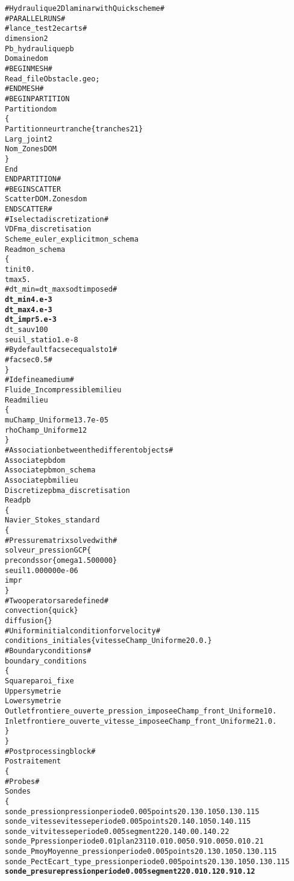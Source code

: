 \begin{alltt}
# Hydraulique 2D laminar with Quick scheme #
# PARALLEL RUNS # 
# lance_test 2 ecarts # 
dimension 2 
Pb_hydraulique pb 
Domaine dom 
# BEGIN MESH # 
Read_file Obstacle.geo ; 
# END MESH # 
# BEGIN PARTITION 
Partition dom 
\{ 
    Partitionneur tranche \{ tranches 2 1 \} 
    Larg_joint 2 
    Nom_Zones DOM 
\} 
End 
END PARTITION # 
# BEGIN SCATTER 
Scatter DOM.Zones dom 
END SCATTER # 
# I select a discretization # 
VDF ma_discretisation 
Scheme_euler_explicit mon_schema 
Read mon_schema 
\{ 
    tinit 0. 
    tmax 5. 
    # dt_min=dt_max so dt imposed # 
    {\bf{dt_min 4.e-3}}
    {\bf{dt_max 4.e-3}}
    {\bf{dt_impr 5.e-3}}
    dt_sauv 100 
    seuil_statio 1.e-8 
    # By default facsec equals to 1 # 
    # facsec 0.5 # 
\} 
# I define a medium # 
Fluide_Incompressible milieu 
Read milieu 
\{ 
    mu Champ_Uniforme 1 3.7e-05 
    rho Champ_Uniforme 1 2 
\} 
# Association between the different objects # 
Associate pb dom 
Associate pb mon_schema 
Associate pb milieu 
Discretize pb ma_discretisation 
Read pb 
\{ 
    Navier_Stokes_standard 
    \{ 
        # Pressure matrix solved with # 
            solveur_pression GCP \{  
            precond ssor \{ omega 1.500000 \}  
            seuil 1.000000e-06  
            impr  
        \} 
        # Two operators are defined # 
        convection \{ quick \} 
        diffusion \{ \} 
        # Uniform initial condition for velocity # 
        conditions_initiales \{ vitesse Champ_Uniforme 2 0. 0. \}
        # Boundary conditions # 
        boundary_conditions 
        \{ 
            Square      paroi_fixe 
            Upper       symetrie 
            Lower       symetrie 
            Outlet      frontiere_ouverte_pression_imposee Champ_front_Uniforme 1 0. 
            Inlet       frontiere_ouverte_vitesse_imposee Champ_front_Uniforme 2 1. 0. 
        \} 
    \} 
    # Post processing block # 
    Postraitement 
    \{ 
        # Probes # 
        Sondes 
        \{ 
            sonde_pression  pression     periode 0.005   points 2 0.13 0.105 0.13 0.115 
            sonde_vitesse   vitesse      periode 0.005   points 2 0.14 0.105    0.14 0.115 
            sonde_vit       vitesse      periode 0.005   segment 22 0.14 0.0 0.14 0.22 
            sonde_P         pression     periode 0.01    plan 23 11 0.01 0.005 0.91 0.005 0.01 0.21 
            sonde_Pmoy      Moyenne_pression    periode 0.005   points 2 0.13 0.105 0.13 0.115 
            sonde_Pect      Ecart_type_pression periode 0.005   points 2 0.13 0.105 0.13 0.115 
            {\bf{sonde_presure   pression  periode 0.005   segment 22 0.01 0.12 0.91 0.12}}

\end{alltt}
